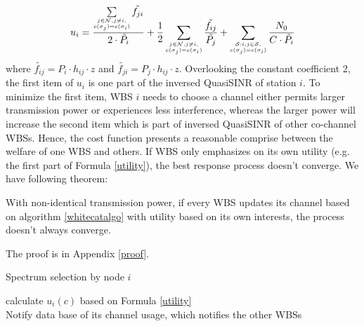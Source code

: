 \begin{equation}
\label{utility}
u_i =\dfrac{\sum\limits_{\tiny\substack{j\in \mathcal{N}, j\ne i,\\ c(\sigma_j)=c(\sigma_i)}}\tilde{f_{ji}}}{2\cdot \tilde{P_i}} + \dfrac{1}{2}\sum_{\tiny\substack{j\in \mathcal{N}, j\ne i,\\ c(\sigma_j)=c(\sigma_i)}}\dfrac{\tilde{f_{ij}}}{\tilde{P_j}} + \sum_{\tiny\substack{\mathcal{S}:i,j\in \mathcal{S},\\ c(\sigma_j)=c(\sigma_i)}}\dfrac{N_0}{C\cdot \tilde{P_i}}\\
\end{equation}
where $\tilde{f_{ij}}= P_i\cdot h_{ij}\cdot z$ and $\tilde{f_{ji}}= P_j\cdot h_{ij}\cdot z$.
Overlooking the constant coefficient 2, the first item of $u_i$ is one part of the inversed QuasiSINR of station $i$. To minimize the first item, WBS $i$ needs to choose a channel either permits larger transmission power or experiences less interference, whereas the larger power will increase the second item which is part of inversed QuasiSINR of other co-channel WBSs. Hence, the cost function presents a reasonable comprise between the welfare of one WBS and others. If WBS only emphasizes on its own utility (e.g. the first part of Formula \ref{utility}), the best response process doesn't converge. We have following theorem:
\begin{theorem}
\label{noconvergence}
With non-identical transmission power, if every WBS updates its channel based on algorithm \ref{whitecatalgo} with utility based on its own interests, the process doesn't always converge.
\end{theorem}
The proof is in Appendix \ref{proof}.


\begin{algorithm}[!h]
\caption{Spectrum selection by node $i$}          %
\label{whitecatalgo} 
{
{
 calculate $u_i(c)$ based on Formula \ref{utility}\\
}
Notify data base of its channel usage, which notifies the other WBSs
}
\end{algorithm}

